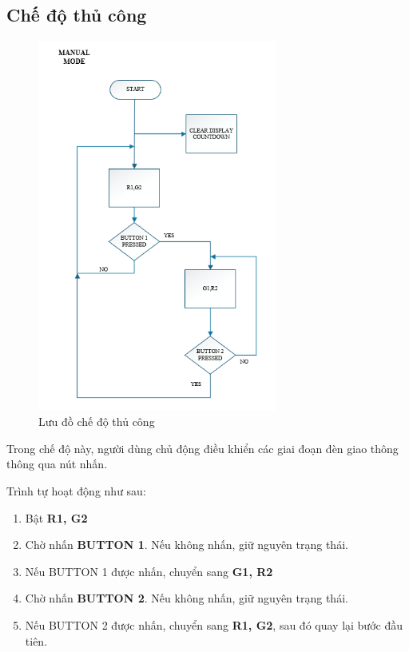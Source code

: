 \subsection{Chế độ thủ công}
\begin{figure}[H]
    \centering
    \includegraphics[width=0.7\textwidth]{pictures/manual.png}
    \caption{Lưu đồ chế độ thủ công}
\end{figure}
\cleardoublepage
Trong chế độ này, người dùng chủ động điều khiển các giai đoạn đèn giao thông thông qua nút nhấn.

Trình tự hoạt động như sau:

\begin{enumerate}
  \item Bật \textbf{R1, G2}
  \item Chờ nhấn \textbf{BUTTON 1}. Nếu không nhấn, giữ nguyên trạng thái.
  \item Nếu BUTTON 1 được nhấn, chuyển sang \textbf{G1, R2}
  \item Chờ nhấn \textbf{BUTTON 2}. Nếu không nhấn, giữ nguyên trạng thái.
  \item Nếu BUTTON 2 được nhấn, chuyển sang \textbf{R1, G2}, sau đó quay lại bước đầu tiên.
\end{enumerate}

